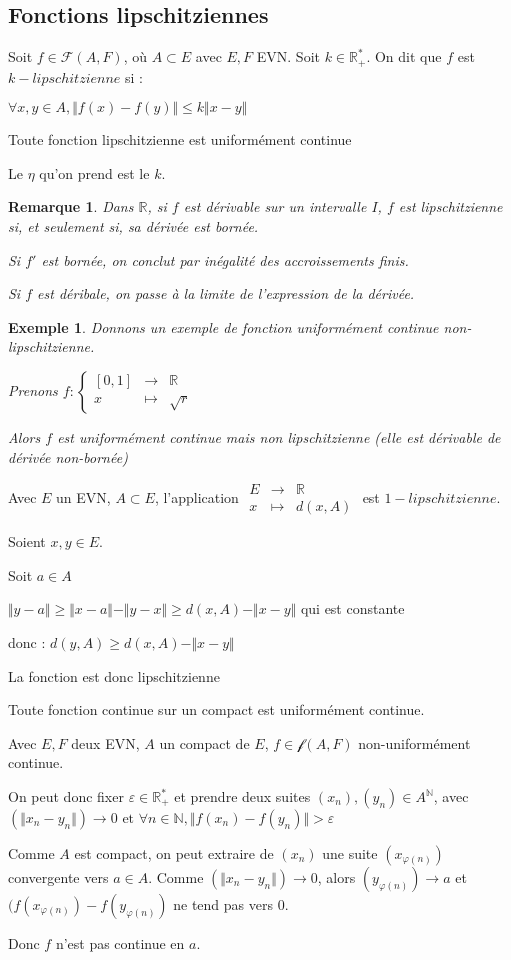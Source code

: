 \documentclass[a4paper,12pt]{book}
\newcommand{\Def}[2]{\begin{tcolorbox}[sharp corners, colback=white,colframe=blue!90!black!75, title=Définition : #1]#2\end{tcolorbox}}
\newcommand{\Thr}[2]{\begin{tcolorbox}[sharp corners, colback=white,colframe=red!90!black!75, title=Théorème : #1]#2\end{tcolorbox}}
\newcommand{\Prop}[2]{\begin{tcolorbox}[sharp corners, colback=white,colframe=red!90!black!75, title=Proposition : #1]#2\end{tcolorbox}}
\newcommand{\Pre}[1]{\begin{tcolorbox}[sharp corners, colback=white,colframe=green!60!green!30!black!75, title=Preuve]#1\end{tcolorbox}}
\newtheorem{Exe}{Exemple}[section]
\newtheorem{Rem}{Remarque}[section]
\def\R{\mathbb{R}}
\def\N{\mathbb{N}}
\begin{document}
\subsection{Fonctions lipschitziennes}
\Def{Fonctions lipschitziennes}{Soit $f\in\mathcal{F}(A,F)$, où $A\subset E$ avec $E,F$ EVN. Soit $k\in\R_+^*$. On dit que $f$ est $k-lipschitzienne$ si :
\par \begin{center} $\forall x,y\in A,\Vert f(x)-f(y)\Vert\leq k\Vert x-y\Vert$ \end{center}}
\Prop{Uniforme continuité des fonctions lipschitziennes}{Toute fonction lipschitzienne est uniformément continue}
\Pre{Le $\eta$ qu'on prend est le $k$.}
\begin{Rem}
Dans $\R$, si $f$ est dérivable sur un intervalle $I$, $f$ est lipschitzienne si, et seulement si, sa dérivée est bornée. \par Si $f'$ est bornée, on conclut par inégalité des accroissements finis. \par Si $f$ est déribale, on passe à la limite de l'expression de la dérivée.
\end{Rem}
\begin{Exe}
Donnons un exemple de fonction uniformément continue non-lipschitzienne. \par Prenons $f:\left\{\begin{array}{rcl} [0,1] & \to & \R \\ x & \mapsto & \sqrt{r} \end{array}\right.$ \par Alors $f$ est uniformément continue mais non lipschitzienne (elle est dérivable de dérivée non-bornée)
\end{Exe}
\Prop{Distance lipschitzienne}{Avec $E$ un EVN, $A\subset E$, l'application $\begin{array}{rcl} E & \to & \R \\ x & \mapsto & d(x,A)\end{array}$ est $1-lipschitzienne$.}
\Pre{Soient $x,y\in E$. \par Soit $a\in A$ \par $\Vert y-a\Vert\geq\Vert x-a\Vert-\Vert y-x\Vert\geq d(x,A)-\Vert x-y\Vert$ qui est constante \par donc : $d(y,A)\geq d(x,A)-\Vert x-y\Vert$ \par La fonction est donc lipschitzienne}
\Thr{Théorème de Heine}{Toute fonction continue sur un compact est uniformément continue.}
\Pre{Avec $E,F$ deux EVN, $A$ un compact de $E$, $f\in\mathcal{f}(A,F)$ non-uniformément continue. \par On peut donc fixer $\varepsilon\in\R_+^*$ et prendre deux suites $(x_n), (y_n)\in A^\N$, avec $(\Vert x_n-y_n\Vert)\to 0\text{ et }\forall n\in\N, \Vert f(x_n)-f(y_n)\Vert>\varepsilon$ \par Comme $A$ est compact, on peut extraire de $(x_n)$ une suite $(x_{\varphi(n)})$ convergente vers $a\in A$. Comme $(\Vert x_n-y_n\Vert)\to 0$, alors $(y_{\varphi(n)})\to a$ et $(f(x_{\varphi(n)})-f(y_{\varphi(n)})$ ne tend pas vers 0. \par Donc $f$ n'est pas continue en $a$.}
\end{document}

